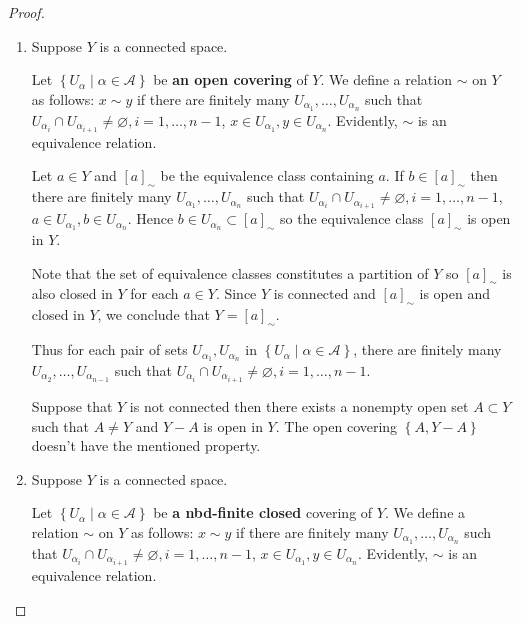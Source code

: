 \begin{proof}
	\begin{enumerate}[label={(\alph*)}]
		\item Suppose \( Y \) is a connected space.

		      Let \( \left\{ U_{\alpha} \mid \alpha \in \mathscr{A} \right\} \) be \textbf{an open covering} of \( Y \). We define a relation \( \sim \) on \( Y \) as follows: \( x \sim y \) if there are finitely many \( U_{\alpha_{1}}, \ldots, U_{\alpha_{n}} \) such that \( U_{\alpha_{i}} \cap U_{\alpha_{i+1}} \ne \varnothing, i = 1, \ldots, n - 1 \), \( x \in U_{\alpha_{1}}, y \in U_{\alpha_{n}} \). Evidently, \( \sim \) is an equivalence relation.

		      Let \( a \in Y \) and \( {[a]}_{\sim} \) be the equivalence class containing \( a \). If \( b \in {[a]}_{\sim} \) then there are finitely many \( U_{\alpha_{1}}, \ldots, U_{\alpha_{n}} \) such that \( U_{\alpha_{i}} \cap U_{\alpha_{i+1}} \ne \varnothing, i = 1, \ldots, n - 1 \), \( a \in U_{\alpha_{1}}, b \in U_{\alpha_{n}} \). Hence \( b \in U_{\alpha_{n}} \subset {[a]}_{\sim} \) so the equivalence class \( {[a]}_{\sim} \) is open in \( Y \).

		      Note that the set of equivalence classes constitutes a partition of \( Y \) so \( {[a]}_{\sim} \) is also closed in \( Y \) for each \( a \in Y \). Since \( Y \) is connected and \( {[a]}_{\sim} \) is open and closed in \( Y \), we conclude that \( Y = {[a]}_{\sim} \).

		      Thus for each pair of sets \( U_{\alpha_{1}}, U_{\alpha_{n}} \) in \( \left\{ U_{\alpha} \mid \alpha \in \mathscr{A} \right\} \), there are finitely many \( U_{\alpha_{2}}, \ldots, U_{\alpha_{n-1}} \) such that \( U_{\alpha_{i}} \cap U_{\alpha_{i+1}} \ne \varnothing, i = 1, \ldots, n - 1 \).

		      Suppose that \( Y \) is not connected then there exists a nonempty open set \( A \subset Y \) such that \( A \ne Y \) and \( Y - A \) is open in \( Y \). The open covering \( \left\{ A, Y - A \right\} \) doesn't have the mentioned property.
		\item Suppose \( Y \) is a connected space.

		      Let \( \left\{ U_{\alpha} \mid \alpha \in \mathscr{A} \right\} \) be \textbf{a nbd-finite closed} covering of \( Y \). We define a relation \( \sim \) on \( Y \) as follows: \( x \sim y \) if there are finitely many \( U_{\alpha_{1}}, \ldots, U_{\alpha_{n}} \) such that \( U_{\alpha_{i}} \cap U_{\alpha_{i+1}} \ne \varnothing, i = 1, \ldots, n - 1 \), \( x \in U_{\alpha_{1}}, y \in U_{\alpha_{n}} \). Evidently, \( \sim \) is an equivalence relation.


\end{enumerate}
\end{proof}
